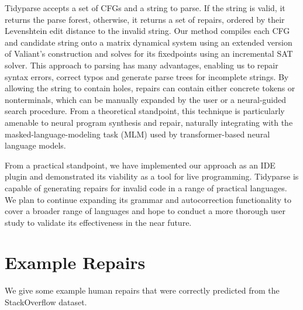 \documentclass[sigplan,review,anonymous,acmsmall]{acmart}\settopmatter{printfolios=false,printccs=false,printacmref=false}
\begin{document}
Tidyparse accepts a set of CFGs and a string to parse. If the string is valid, it returns the parse forest, otherwise, it returns a set of repairs, ordered by their Levenshtein edit distance to the invalid string. Our method compiles each CFG and candidate string onto a matrix dynamical system using an extended version of Valiant's construction and solves for its fixedpoints using an incremental SAT solver. This approach to parsing has many advantages, enabling us to repair syntax errors, correct typos and generate parse trees for incomplete strings. By allowing the string to contain holes, repairs can contain either concrete tokens or nonterminals, which can be manually expanded by the user or a neural-guided search procedure. From a theoretical standpoint, this technique is particularly amenable to neural program synthesis and repair, naturally integrating with the masked-language-modeling task (MLM) used by transformer-based neural language models.

From a practical standpoint, we have implemented our approach as an IDE plugin and demonstrated its viability as a tool for live programming. Tidyparse is capable of generating repairs for invalid code in a range of practical languages. We plan to continue expanding its grammar and autocorrection functionality to cover a broader range of languages and hope to conduct a more thorough user study to validate its effectiveness in the near future.

\pagebreak

\appendix

\pagebreak\section{Example Repairs}

We give some example human repairs that were correctly predicted from the StackOverflow dataset.
\end{document}
